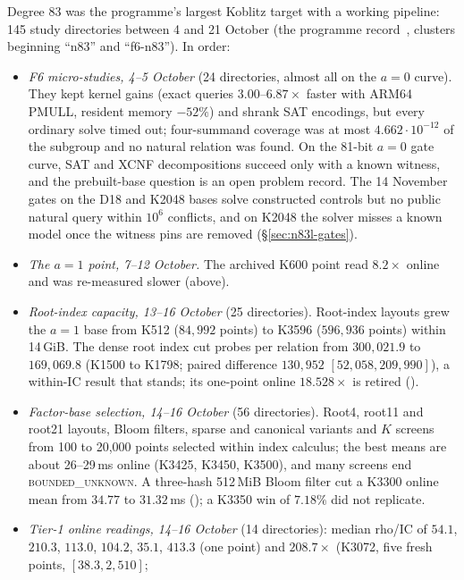 Degree 83 was the programme's largest Koblitz target with a working
pipeline: 145 study directories between 4 and 21 October
(the programme record~\cite{icprogram2026}, clusters beginning ``n83'' and ``f6-n83'').
In order:
\begin{itemize}
\item \emph{F6 micro-studies, 4--5 October} (24 directories, almost all on
  the $a=0$ curve). They kept kernel gains (exact queries $3.00$--$6.87\times$
  faster with ARM64 PMULL, resident memory $-52\%$) and shrank SAT encodings, but every
  ordinary solve timed out; four-summand coverage was at most
  $4.662\cdot10^{-12}$ of the subgroup and no natural relation was found.
  On the 81-bit $a=0$ gate curve, SAT and XCNF decompositions succeed only
  with a known witness, and the prebuilt-base question is an open problem
  record. The 14 November gates on the D18 and K2048 bases solve
  constructed controls but no public natural query within $10^6$ conflicts,
  and on K2048 the solver misses a known model once the witness pins are
  removed (\S\ref{sec:n83l-gates}).
\item \emph{The $a=1$ point, 7--12 October.} The archived K600 point read
  $8.2\times$ online and was re-measured slower (above).
\item \emph{Root-index capacity, 13--16 October} (25 directories). Root-index
  layouts grew the $a=1$ base from K512 ($84{,}992$ points) to K3596
  ($596{,}936$ points) within 14\,GiB. The dense root index cut probes per
  relation from $300{,}021.9$ to $169{,}069.8$ (K1500 to K1798; paired
  difference $130{,}952$ $[52{,}058,209{,}990]$), a within-IC result that
  stands; its one-point online $18.528\times$ is retired
  ().
\item \emph{Factor-base selection, 14--16 October} (56 directories). Root4,
  root11 and root21 layouts, Bloom filters, sparse and canonical variants
  and $K$ screens from 100 to 20{,}000 points selected within index calculus;
  the best means are about 26--29\,ms online (K3425, K3450, K3500), and
  many screens end \textsc{bounded\_unknown}. A three-hash 512\,MiB Bloom
  filter cut a K3300 online mean from $34.77$ to $31.32$\,ms
  (); a K3350 win of
  $7.18\%$ did not replicate.
\item \emph{Tier-1 online readings, 14--16 October} (14 directories): median
  rho/IC of $54.1$, $210.3$, $113.0$, $104.2$, $35.1$, $413.3$ (one point)
  and $208.7\times$ (K3072, five fresh points, $[38.3,2{,}510]$;

\end{itemize}
